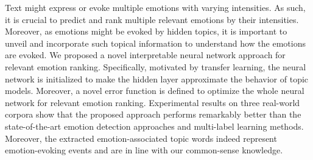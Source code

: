 Text might express or evoke multiple emotions with varying intensities. As such, it is crucial to predict and rank multiple relevant emotions by their intensities. Moreover, as emotions might be evoked by hidden topics, it is important to unveil and incorporate such topical information to understand how the emotions are evoked. We proposed a novel interpretable neural network approach for relevant emotion ranking. Specifically, motivated by transfer learning, the neural network is initialized to make the hidden layer approximate the behavior of topic models.  Moreover, a novel error function is defined to optimize the whole neural network for relevant emotion ranking. Experimental results on three real-world corpora show that the proposed approach performs remarkably better than the state-of-the-art emotion detection approaches and multi-label learning methods. Moreover, the extracted emotion-associated topic words indeed represent emotion-evoking events and are in line with our common-sense knowledge.
